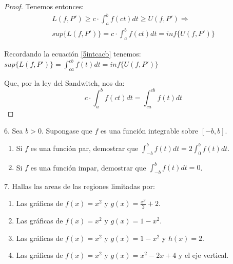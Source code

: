 \documentclass[12pt]{article}
\begin{document}
\begin{proof}
    Tenemos entonces:
    \begin{multline*}
        L(f,P')\geq c\cdot\int_{a}^{b}f(ct)dt\geq U(f,P') \Longrightarrow \\ sup\{L(f,P')\}=c\cdot\int_{a}^{b}f(ct)dt=inf\{U(f,P')\}
    \end{multline*}

    Recordando la ecuaci\'on \eqref{5intcacb} tenemos: \(sup\{L(f,P')\}=\displaystyle\int_{ca}^{cb}f(t)dt=inf\{U(f,P')\}\)

    Que, por la ley del Sandwitch, nos da:
    \begin{equation*}
        c\cdot\int_{a}^{b}f(ct)dt=\int_{ca}^{cb}f(t)dt
    \end{equation*}

\end{proof}

6. Sea $b>0$. Supongase que $f$ es una funci\'on integrable sobre $[-b,b]$.

\begin{enumerate}[\hspace{9px} a)]
    \item Si $f$ es una funci\'on par, demostrar que \(\displaystyle\int_{-b}^{b}f(t)dt=2\int_{0}^{b}f(t)dt\).

    \item Si $f$ es una funci\'on impar, demostrar que \(\displaystyle\int_{-b}^{b}f(t)dt=0\).

\end{enumerate}

7. Hallas las areas de las regiones limitadas por:

\begin{enumerate}[\hspace{9px} a)]
    \item Las gr\'aficas de \(f(x)=x^2\) y \(g(x)=\displaystyle\frac{x^2}{2}+2\).

    \item Las gr\'aficas de \(f(x)=x^2\) y \(g(x)=1-x^2\).

    \item Las gr\'aficas de \(f(x)=x^2\) y \(g(x)=1-x^2\) y \(h(x)=2\).

    \item Las gr\'aficas de \(f(x)=x^2\) y \(g(x)=x^2-2x+4\) y el eje vertical.

\end{enumerate}
\end{document}
